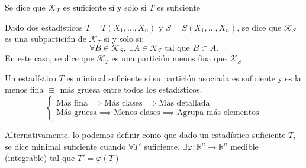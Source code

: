 
\begin{proposición}
	Se dice que $\mathcal{K}_{T}$ es suficiente sí y sólo si $T$ es suficiente\\
\end{proposición}

\begin{proposición}
	Dado dos estadísticos $T = T(X_1, \dots, X_n)$ y $S = S(X_1, \dots, X_n)$, se dice que $\mathcal{K}_S$ es una subpartición de $\mathcal{K}_T$ si y solo si:  
	$$ \forall B \in \mathcal{K}_S, \ \exists A \in \mathcal{K}_T \text{ tal que } B \subset A.$$
	En este caso, se dice que $\mathcal{K}_T$ es una partición menos fina que $\mathcal{K}_S$.
\end{proposición}
  
\begin{definición}
	Un estadístico $T$ es minimal suficiente si su partición asociada es suficiente y es la menos fina $\equiv$ más gruesa entre todos los estadísticos. \\
	\[
		\begin{cases} 
			\text{Más fina} \implies \text{Más clases} \implies \text{Más detallada}           \\ 
			\text{Más gruesa} \implies \text{Menos clases} \implies \text{Agrupa más elementos} 
		\end{cases}
	\]
	    
	Alternativamente, lo podemos definir como que dado un estadístico suficiente $T$, se dice minimal suficiente cuando $\forall T'$ suficiente, $\exists \varphi: \mathbb{R}^n \to \mathbb{R}^n$ medible (integrable) tal que $T' = \varphi(T)$
\end{definición}
  
